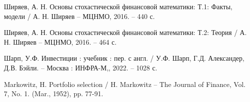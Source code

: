 \newpage
{}
\renewcommand{\bibsection}{\centering\textbf{\large СПИСОК ИСПОЛЬЗОВАННЫХ ИСТОЧНИКОВ}}



\begin{thebibliography}{9}
    Ширяев, А. Н. Основы стохастической финансовой математики: Т.1: Факты, модели / А. Н. Ширяев -- МЦНМО, 2016. -- 440 с.

    Ширяев, А. Н. Основы стохастической финансовой математики: Т.2: Теория / А. Н. Ширяев -- МЦНМО, 2016. -- 464 с.

    Шарп, У.Ф. Инвестиции : учебник : пер. с англ. / У.Ф. Шарп, Г.Д. Александер, Д.В. Бэйли. -- Москва : ИНФРА-М,, 2022. -- 1028 с.

    Markowitz, H. Portfolio selection / H. Markowitz -- The Journal of Finance, Vol. 7, No. 1. (Mar., 1952), pp. 77-91.
\end{thebibliography}

